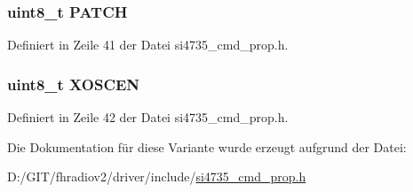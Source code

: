 \hypertarget{unionpower__up__arg1_aa2fc9067222815bec88b0dc6048b2956}{}
\subsubsection[{P\+A\+T\+C\+H}]{\setlength{\rightskip}{0pt plus 5cm}uint8\+\_\+t P\+A\+T\+C\+H}\label{unionpower__up__arg1_aa2fc9067222815bec88b0dc6048b2956}


Definiert in Zeile 41 der Datei si4735\+\_\+cmd\+\_\+prop.\+h.

\hypertarget{unionpower__up__arg1_a56b7fb7e7e5dfc8eed9d066f71579077}{}
\subsubsection[{X\+O\+S\+C\+E\+N}]{\setlength{\rightskip}{0pt plus 5cm}uint8\+\_\+t X\+O\+S\+C\+E\+N}\label{unionpower__up__arg1_a56b7fb7e7e5dfc8eed9d066f71579077}


Definiert in Zeile 42 der Datei si4735\+\_\+cmd\+\_\+prop.\+h.



Die Dokumentation für diese Variante wurde erzeugt aufgrund der Datei\+:\begin{DoxyCompactItemize}
\item 
D\+:/\+G\+I\+T/fhradiov2/driver/include/\hyperlink{si4735__cmd__prop_8h}{si4735\+\_\+cmd\+\_\+prop.\+h}\end{DoxyCompactItemize}
